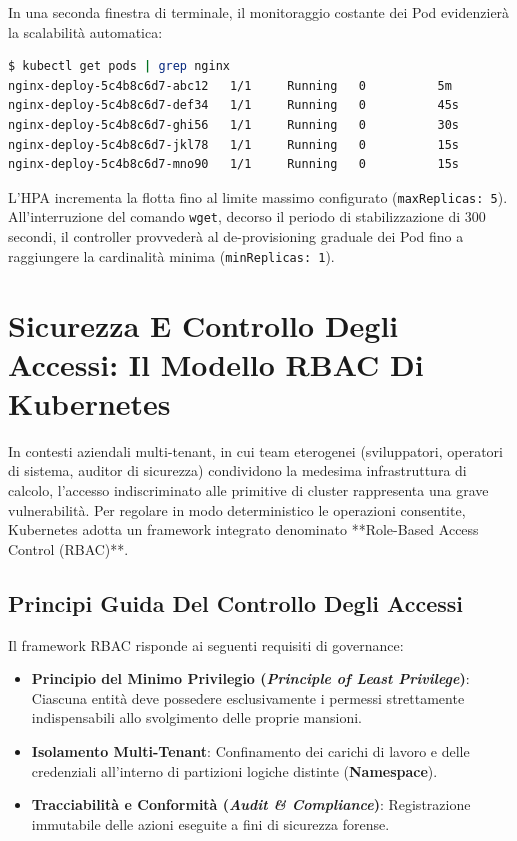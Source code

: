 \documentclass[11pt, a4paper]{article}
\begin{document}
In una seconda finestra di terminale, il monitoraggio costante dei Pod evidenzierà la scalabilità automatica:
\begin{lstlisting}[language=bash]
$ kubectl get pods | grep nginx
nginx-deploy-5c4b8c6d7-abc12   1/1     Running   0          5m
nginx-deploy-5c4b8c6d7-def34   1/1     Running   0          45s
nginx-deploy-5c4b8c6d7-ghi56   1/1     Running   0          30s
nginx-deploy-5c4b8c6d7-jkl78   1/1     Running   0          15s
nginx-deploy-5c4b8c6d7-mno90   1/1     Running   0          15s
\end{lstlisting}
L'HPA incrementa la flotta fino al limite massimo configurato (\texttt{maxReplicas: 5}). All'interruzione del comando \texttt{wget}, decorso il periodo di stabilizzazione di 300 secondi, il controller provvederà al de-provisioning graduale dei Pod fino a raggiungere la cardinalità minima (\texttt{minReplicas: 1}).

\newpage


\section{Sicurezza E Controllo Degli Accessi: Il Modello RBAC Di Kubernetes}

In contesti aziendali multi-tenant, in cui team eterogenei (sviluppatori, operatori di sistema, auditor di sicurezza) condividono la medesima infrastruttura di calcolo, l'accesso indiscriminato alle primitive di cluster rappresenta una grave vulnerabilità.
Per regolare in modo deterministico le operazioni consentite, Kubernetes adotta un framework integrato denominato **Role-Based Access Control (RBAC)**.

\subsection{Principi Guida Del Controllo Degli Accessi}
Il framework RBAC risponde ai seguenti requisiti di governance:
\begin{itemize}[noitemsep]
    \item \textbf{Principio del Minimo Privilegio (\emph{Principle of Least Privilege})}: Ciascuna entità deve possedere esclusivamente i permessi strettamente indispensabili allo svolgimento delle proprie mansioni.
    \item \textbf{Isolamento Multi-Tenant}: Confinamento dei carichi di lavoro e delle credenziali all'interno di partizioni logiche distinte (\textbf{Namespace}).
    \item \textbf{Tracciabilità e Conformità (\emph{Audit \& Compliance})}: Registrazione immutabile delle azioni eseguite a fini di sicurezza forense.
\end{itemize}
\end{document}
